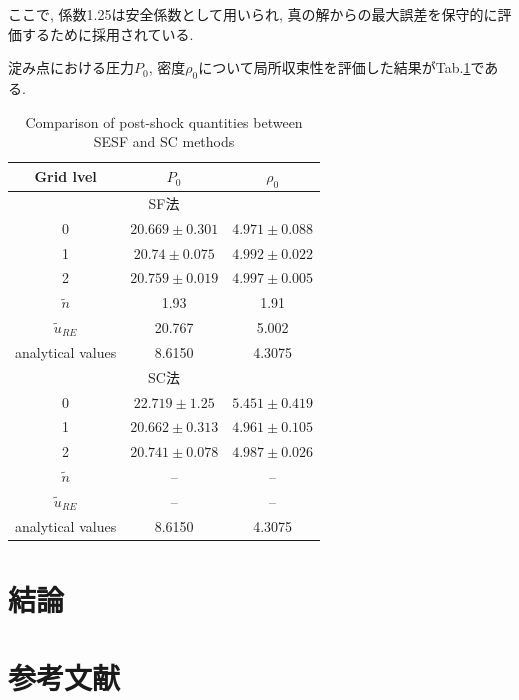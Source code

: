 \documentclass[a4j]{jarticle}
\begin{document}
ここで, 係数1.25は安全係数として用いられ, 
真の解からの最大誤差を保守的に評価するために採用されている.

淀み点における圧力$P_0$, 密度$\rho_0$について局所収束性を評価した結果がTab.\ref{tab:2Dcircle_griconv}である.

\begin{table}[H]
  \centering
  \caption{Comparison of post-shock quantities between SESF and SC methods}
  \vspace{2mm}
  \begin{tabular}{ccc}
    \hline
    Grid lvel & $P_0$ & $\rho_0$\\
    \hline
    \multicolumn{3}{c}{SF法} \\
    \hline
    0        & $20.669 \pm 0.301$ & $4.971 \pm 0.088$  \\
    1  & $20.74 \pm 0.075$  & $4.992 \pm 0.022$  \\
    2          & $20.759 \pm 0.019$ & $4.997 \pm 0.005$  \\
    $\tilde{n}$   & 1.93               & 1.91   \\
    $\tilde{u}_{RE}$ & 20.767          & 5.002 \\
    analytical values & 8.6150         & 4.3075   \\
    \hline
    \multicolumn{3}{c}{SC法} \\
    \hline
    0        & $22.719 \pm 1.25$  & $5.451 \pm 0.419$  \\
    1  & $20.662 \pm 0.313$ & $4.961 \pm 0.105$  \\
    2          & $20.741 \pm 0.078$ & $4.987 \pm 0.026$  \\
    $\tilde{n}$   & --                 & --                  \\
    $\tilde{u}_{RE}$ & --              & --                \\
    analytical values & 8.6150         & 4.3075             \\
    \hline
  \end{tabular}
  \label{tab:2Dcircle_griconv}
\end{table}



\clearpage
\section{結論} \label{sec:conclusion}

\section*{参考文献}
\end{document}
